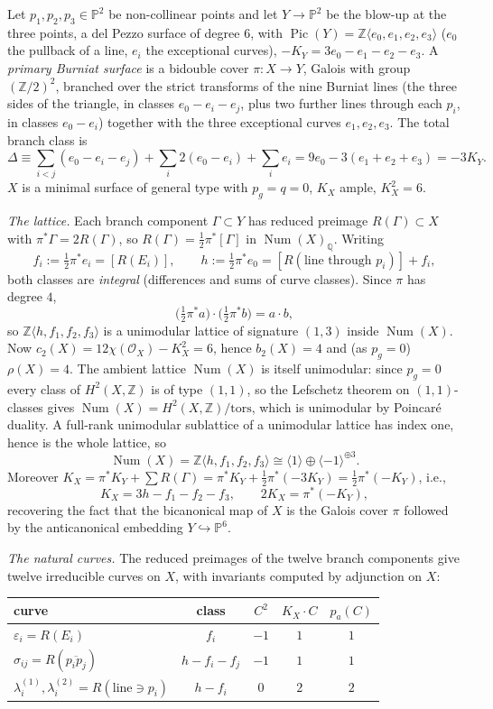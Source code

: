 \documentclass[10pt,a4paper]{amsart}
\newcommand{\OO}{\mathcal{O}}
\newcommand{\PP}{\mathbb{P}}
\newcommand{\ZZ}{\mathbb{Z}}
\newcommand{\Num}{\operatorname{Num}}
\newcommand{\Pic}{\operatorname{Pic}}
\begin{document}
Let $p_1,p_2,p_3\in\PP^2$ be non-collinear points and let $Y\to\PP^2$ be the blow-up at the three points, a del Pezzo surface of degree $6$, with $\Pic(Y)=\ZZ\langle e_0,e_1,e_2,e_3\rangle$ ($e_0$ the pullback of a line, $e_i$ the exceptional curves), $-K_Y=3e_0-e_1-e_2-e_3$. A \emph{primary Burniat surface} is a bidouble cover $\pi:X\to Y$, Galois with group $(\ZZ/2)^2$, branched over the strict transforms of the nine Burniat lines (the three sides of the triangle, in classes $e_0-e_i-e_j$, plus two further lines through each $p_i$, in classes $e_0-e_i$) together with the three exceptional curves $e_1,e_2,e_3$. The total branch class is
\[
\Delta\equiv\textstyle\sum_{i<j}(e_0-e_i-e_j)+\sum_i2(e_0-e_i)+\sum_ie_i=9e_0-3(e_1+e_2+e_3)=-3K_Y .
\]
$X$ is a minimal surface of general type with $p_g=q=0$, $K_X$ ample, $K_X^2=6$.

\smallskip
\noindent \emph{The lattice.} Each branch component $\Gamma\subset Y$ has reduced preimage $R(\Gamma)\subset X$ with $\pi^*\Gamma=2R(\Gamma)$, so $R(\Gamma)=\tfrac12\pi^*[\Gamma]$ in $\Num(X)_\mathbb{Q}$. Writing
\[
f_i:=\tfrac12\pi^*e_i=[R(E_i)],\qquad
h:=\tfrac12\pi^*e_0=[R(\text{line through }p_i)]+f_i ,
\]
both classes are \emph{integral} (differences and sums of curve classes). Since $\pi$ has degree $4$,
\[
\bigl(\tfrac12\pi^*a\bigr)\cdot\bigl(\tfrac12\pi^*b\bigr)=a\cdot b ,
\]
so $\ZZ\langle h,f_1,f_2,f_3\rangle$ is a unimodular lattice of signature $(1,3)$ inside $\Num(X)$. Now $c_2(X)=12\chi(\OO_X)-K_X^2=6$, hence $b_2(X)=4$ and (as $p_g=0$) $\rho(X)=4$. The ambient lattice $\Num(X)$ is itself unimodular: since $p_g=0$ every class of $H^2(X,\ZZ)$ is of type $(1,1)$, so the Lefschetz theorem on $(1,1)$-classes gives $\Num(X)=H^2(X,\ZZ)/\mathrm{tors}$, which is unimodular by Poincar\'e duality. A full-rank unimodular sublattice of a unimodular lattice has index one, hence is the whole lattice, so
\[
\Num(X)=\ZZ\langle h,f_1,f_2,f_3\rangle\cong\langle1\rangle\oplus\langle-1\rangle^{\oplus3}.
\]
Moreover $K_X=\pi^*K_Y+\sum R(\Gamma)=\pi^*K_Y+\tfrac12\pi^*(-3K_Y)=\tfrac12\pi^*(-K_Y)$, i.e.,
\[
K_X=3h-f_1-f_2-f_3,\qquad 2K_X=\pi^*(-K_Y),
\]
recovering the fact that the bicanonical map of $X$ is the Galois cover $\pi$ followed by the anticanonical embedding $Y\hookrightarrow\PP^6$.

\smallskip
\noindent \emph{The natural curves.} The reduced preimages of the twelve branch components give twelve irreducible curves on $X$, with invariants computed by adjunction on $X$:
\begin{center}
\begin{tabular}{lcccc}
\toprule
curve & class & $C^2$ & $K_X\cdot C$ & $p_a(C)$\\
\midrule
$\varepsilon_i=R(E_i)$ & $f_i$ & $-1$ & $1$ & $1$\\
$\sigma_{ij}=R(\overline{p_ip_j})$ & $h-f_i-f_j$ & $-1$ & $1$ & $1$\\
$\lambda_i^{(1)},\lambda_i^{(2)}=R(\text{line}\ni p_i)$ & $h-f_i$ & $0$ & $2$ & $2$\\
\bottomrule
\end{tabular}
\end{center}
\end{document}
